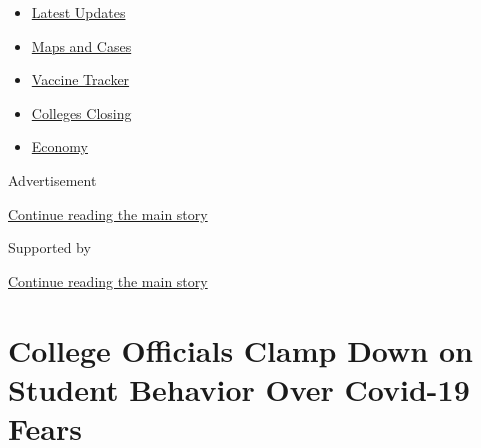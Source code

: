 \begin{itemize}
\tightlist
\item
  \href{https://www.nytimes3xbfgragh.onion/2020/08/20/world/coronavirus-covid.html?name=styln-coronavirus-national\&region=TOP_BANNER\&variant=undefined\&block=storyline_menu_recirc\&action=click\&pgtype=Article\&impression_id=4c24ea10-e383-11ea-81b0-ed0ce085a510}{Latest
  Updates}
\item
  \href{https://www.nytimes3xbfgragh.onion/interactive/2020/us/coronavirus-us-cases.html?name=styln-coronavirus-national\&region=TOP_BANNER\&variant=undefined\&block=storyline_menu_recirc\&action=click\&pgtype=Article\&impression_id=4c24ea11-e383-11ea-81b0-ed0ce085a510}{Maps
  and Cases}
\item
  \href{https://www.nytimes3xbfgragh.onion/interactive/2020/science/coronavirus-vaccine-tracker.html?name=styln-coronavirus-national\&region=TOP_BANNER\&variant=undefined\&block=storyline_menu_recirc\&action=click\&pgtype=Article\&impression_id=4c24ea12-e383-11ea-81b0-ed0ce085a510}{Vaccine
  Tracker}
\item
  \href{https://www.nytimes3xbfgragh.onion/2020/08/19/us/colleges-closing-covid.html?name=styln-coronavirus-national\&region=TOP_BANNER\&variant=undefined\&block=storyline_menu_recirc\&action=click\&pgtype=Article\&impression_id=4c24ea13-e383-11ea-81b0-ed0ce085a510}{Colleges
  Closing}
\item
  \href{https://www.nytimes3xbfgragh.onion/live/2020/08/20/business/stock-market-today-coronavirus?name=styln-coronavirus-national\&region=TOP_BANNER\&variant=undefined\&block=storyline_menu_recirc\&action=click\&pgtype=Article\&impression_id=4c24ea14-e383-11ea-81b0-ed0ce085a510}{Economy}
\end{itemize}

Advertisement

\protect\hyperlink{after-top}{Continue reading the main story}

Supported by

\protect\hyperlink{after-sponsor}{Continue reading the main story}

\hypertarget{college-officials-clamp-down-on-student-behavior-over-covid-19-fears}{%
\section{College Officials Clamp Down on Student Behavior Over Covid-19
Fears}\label{college-officials-clamp-down-on-student-behavior-over-covid-19-fears}}

